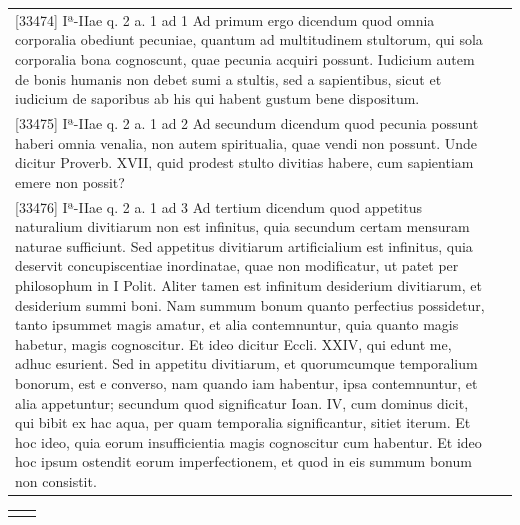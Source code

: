 \documentclass[paper=a4paper,fontsize=10pt,jafontsize=9pt,titlepage]{jlreq}
\begin{document}
\begin{longtable}{p{21em}p{21em}}
[33474] Iª-IIae q. 2 a. 1 ad 1 Ad primum ergo dicendum quod omnia
 corporalia obediunt pecuniae, quantum ad multitudinem stultorum, qui
 sola corporalia bona cognoscunt, quae pecunia acquiri possunt. Iudicium
 autem de bonis humanis non debet sumi a stultis, sed a sapientibus,
 sicut et iudicium de saporibus ab his qui habent gustum bene
 dispositum.

 
&


\\




[33475] Iª-IIae q. 2 a. 1 ad 2 Ad secundum dicendum quod pecunia possunt
 haberi omnia venalia, non autem spiritualia, quae vendi non
 possunt. Unde dicitur Proverb. XVII, quid prodest stulto divitias
 habere, cum sapientiam emere non possit?
 
&


\\




[33476] Iª-IIae q. 2 a. 1 ad 3 Ad tertium dicendum quod appetitus
 naturalium divitiarum non est infinitus, quia secundum certam mensuram
 naturae sufficiunt. Sed appetitus divitiarum artificialium est
 infinitus, quia deservit concupiscentiae inordinatae, quae non
 modificatur, ut patet per philosophum in I Polit. Aliter tamen est
 infinitum desiderium divitiarum, et desiderium summi boni. Nam summum
 bonum quanto perfectius possidetur, tanto ipsummet magis amatur, et
 alia contemnuntur, quia quanto magis habetur, magis cognoscitur. Et
 ideo dicitur Eccli. XXIV, qui edunt me, adhuc esurient. Sed in appetitu
 divitiarum, et quorumcumque temporalium bonorum, est e converso, nam
 quando iam habentur, ipsa contemnuntur, et alia appetuntur; secundum
 quod significatur Ioan. IV, cum dominus dicit, qui bibit ex hac aqua,
 per quam temporalia significantur, sitiet iterum. Et hoc ideo, quia
 eorum insufficientia magis cognoscitur cum habentur. Et ideo hoc ipsum
 ostendit eorum imperfectionem, et quod in eis summum bonum non
 consistit.
 
&



\end{longtable}


\newpage


\begin{longtable}{p{21em}p{21em}}


&

\end{longtable}
\end{document}
